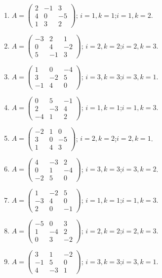 \begin{enumerate}[label=\arabic*.,  leftmargin=*]
\item $A=\begin{pmatrix}2&-1&3\\4&0&-5\\1&3&2\end{pmatrix}$; \quad $i=1, k=1$;\quad $i=1, k=2$.
\item $A=\begin{pmatrix}-3&2&1\\0&4&-2\\5&-1&3\end{pmatrix}$; \quad $i=2, k=2$;\quad $i=2, k=3$.
\item $A=\begin{pmatrix}1&0&-4\\3&-2&5\\-1&4&0\end{pmatrix}$; \quad $i=3, k=3$;\quad $i=3, k=1$.
\item $A=\begin{pmatrix}0&5&-1\\2&-3&4\\-4&1&2\end{pmatrix}$; \quad $i=1, k=1$;\quad $i=1, k=3$.
\item $A=\begin{pmatrix}-2&1&0\\3&0&-5\\1&4&3\end{pmatrix}$; \quad $i=2, k=2$;\quad $i=2, k=1$.
\item $A=\begin{pmatrix}4&-3&2\\0&1&-4\\-2&5&0\end{pmatrix}$; \quad $i=3, k=3$;\quad $i=3, k=2$.
\item $A=\begin{pmatrix}1&-2&5\\-3&4&0\\2&0&-1\end{pmatrix}$; \quad $i=1, k=1$;\quad $i=1, k=3$.
\item $A=\begin{pmatrix}-5&0&3\\1&-4&2\\0&3&-2\end{pmatrix}$; \quad $i=2, k=2$;\quad $i=2, k=3$.
\item $A=\begin{pmatrix}3&1&-2\\-1&5&0\\4&-3&1\end{pmatrix}$; \quad $i=3, k=3$;\quad $i=3, k=1$.

\end{enumerate}

